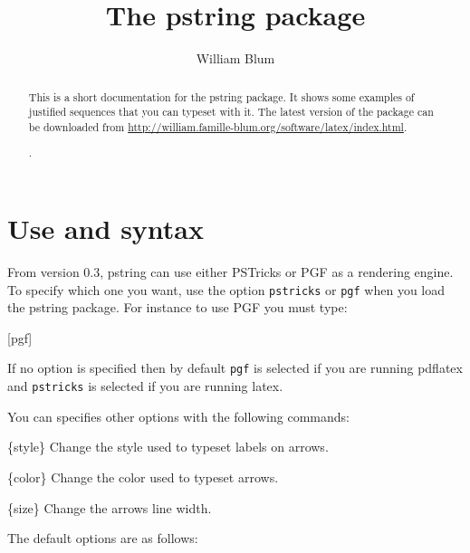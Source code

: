 
%

\author{William Blum}
\title{The pstring package}

\maketitle
\begin{abstract}
This is a short documentation for the pstring package. It shows some examples of justified sequences that you can typeset with it.
The latest version of the package can be downloaded from \url{http://william.famille-blum.org/software/latex/index.html}.

\begin{codeexample}[width=5cm]
.
\end{codeexample}
\end{abstract}

\section{Use and syntax}

From version 0.3, pstring can use either PSTricks or PGF as a rendering engine. To specify which one
you want, use the option \verb|pstricks| or \verb|pgf| when you load the pstring package. For instance to use PGF you must type:
\begin{codeexample}
\usepackage{pstring}[pgf]
\end{codeexample}
If no option is specified then by default \verb|pgf| is selected if you are running pdflatex
and \verb|pstricks| is selected if you are running latex.

You can specifies other options with the following commands:
\begin{command}{\pstrSetLabelStyle\{style\}}
Change the style used to typeset labels on arrows.
\end{command}
\begin{command}{\pstrSetArrowColor\{color\}}
Change the color used to typeset arrows.
\end{command}
\begin{command}{\pstrSetArrowLineWidth\{size\}}
Change the arrows line width.
\end{command}
The default options are as follows:
\begin{codeexample}
\pstrSetLabelStyle{\color{blue} \tiny}
\pstrSetArrowLineWidth{0.3pt}
\end{codeexample}

